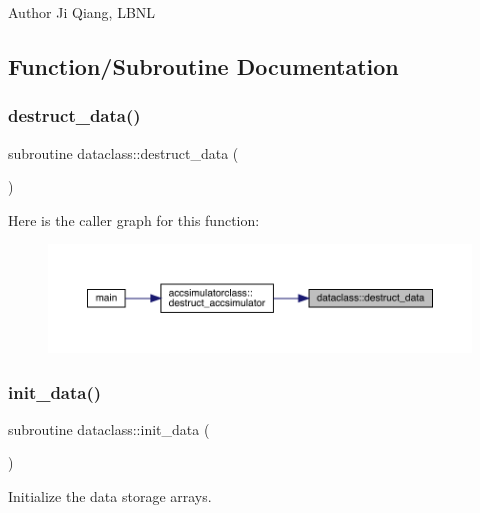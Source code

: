 \begin{DoxyAuthor}{Author}
Ji Qiang, L\+B\+NL 
\end{DoxyAuthor}


\subsection{Function/\+Subroutine Documentation}
\mbox{\label{namespacedataclass_ac5b255034c2a115b6740378b4d1e630e}} 
\subsubsection{\texorpdfstring{destruct\_data()}{destruct\_data()}}
{\footnotesize\ttfamily subroutine dataclass\+::destruct\+\_\+data (\begin{DoxyParamCaption}{ }\end{DoxyParamCaption})}

Here is the caller graph for this function\+:\nopagebreak
\begin{figure}[H]
\begin{center}
\leavevmode
\includegraphics[width=350pt]{namespacedataclass_ac5b255034c2a115b6740378b4d1e630e_icgraph}
\end{center}
\end{figure}
\mbox{\label{namespacedataclass_a474ffe5e76484d63015aaf6255c27294}} 
\subsubsection{\texorpdfstring{init\_data()}{init\_data()}}
{\footnotesize\ttfamily subroutine dataclass\+::init\+\_\+data (\begin{DoxyParamCaption}{ }\end{DoxyParamCaption})}



Initialize the data storage arrays. 

